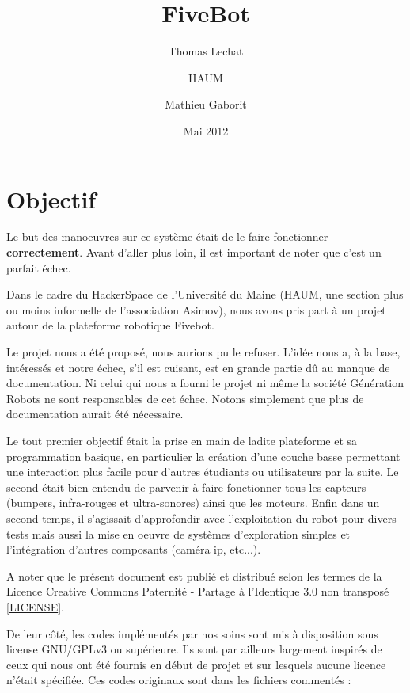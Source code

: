 \documentclass[a4paper]{report}
\title{\phantomsection%
  FiveBot%
  \label{fivebot}}
\author{Thomas Lechat \and HAUM \and Mathieu Gaborit}
\date{Mai 2012}
\begin{document}
\maketitle

\tableofcontents
\newpage


\section{Objectif%
  \label{objectif}%
}

Le but des manoeuvres sur ce système était de le faire fonctionner \textbf{correctement}.
Avant d'aller plus loin, il est important de noter que c'est un parfait échec.

Dans le cadre du HackerSpace de l'Université du Maine (HAUM, une section plus ou moins informelle de l'association Asimov), nous avons pris part à un projet autour de la plateforme robotique Fivebot.

Le projet nous a été proposé, nous aurions pu le refuser.
L'idée nous a, à la base, intéressés et notre échec, s'il est cuisant, est en grande partie dû au manque de documentation.
Ni celui qui nous a fourni le projet ni même la société Génération Robots ne sont responsables de cet échec.
Notons simplement que plus de documentation aurait été nécessaire.

Le tout premier objectif était la prise en main de ladite plateforme et sa programmation basique, en particulier la création d'une couche basse permettant une interaction plus facile pour d'autres étudiants ou utilisateurs par la suite.
Le second était bien entendu de parvenir à faire fonctionner tous les capteurs (bumpers, infra-rouges et ultra-sonores) ainsi que les moteurs.
Enfin dans un second temps, il s'agissait d'approfondir avec l'exploitation du robot pour divers tests mais aussi la mise en oeuvre de systèmes d'exploration simples et l'intégration d'autres composants (caméra ip, etc...).

A noter que le présent document est publié et distribué selon les termes de la Licence Creative Commons Paternité - Partage à l'Identique 3.0 non transposé {[}\href{http://creativecommons.org/licenses/by-sa/3.0/}{LICENSE}{]}.

De leur côté, les codes implémentés par nos soins sont mis à disposition sous license GNU/GPLv3 ou supérieure.
Ils sont par ailleurs largement inspirés de ceux qui nous ont été fournis en début de projet et sur lesquels aucune licence n'était spécifiée. Ces codes originaux sont dans les fichiers commentés :
\end{document}
